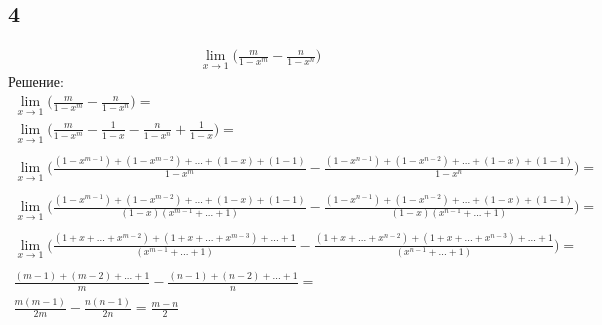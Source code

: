 		\subsection{4}
		\begin{gather*}
			\lim_{x\to 1} \biggl(\frac{m}{1 - x^m} - \frac{n}{1 - x^n}\biggl)
		\end{gather*}
		Решение:
		\begin{gather*}
			\lim_{x\to 1} \biggl(
				\frac{m}{1 - x^m} - 
				\frac{n}{1 - x^n}
			\biggl) = \\
			\lim_{x\to 1} \biggl(
				\frac{m}{1 - x^m} - \frac{1}{1-x} - 
				\frac{n}{1 - x^n} + \frac{1}{1-x}
			\biggl) = \\ 
			\\
			\lim_{x\to 1} \biggl(
				\frac{(1-x^{m-1}) + (1-x^{m-2}) + ... + (1 - x) + (1 - 1)}{1 - x^m} - 
				\frac{(1-x^{n-1}) + (1-x^{n-2}) + ... + (1 - x) + (1 - 1)}{1 - x^n}
			\biggl) = \\ 
			\\
			\lim_{x\to 1} \biggl(
				\frac{(1-x^{m-1}) + (1-x^{m-2}) + ... + (1 - x) + (1 - 1)}{(1 - x)(x^{m-1} + ... + 1)} - 
				\frac{(1-x^{n-1}) + (1-x^{n-2}) + ... + (1 - x) + (1 - 1)}{(1 - x)(x^{n-1} + ... + 1)}
			\biggl) = \\ 
			\\
			\lim_{x\to 1} \biggl(
				\frac{(1 + x + ... + x^{m-2}) + (1 + x + ... + x^{m-3}) + ... + 1}{(x^{m-1} + ... + 1)} - 
				\frac{(1 + x + ... + x^{n-2}) + (1 + x + ... + x^{n-3}) + ... + 1}{(x^{n-1} + ... + 1)}
			\biggl) = \\ 
			\\	
			\frac{(m - 1) + (m - 2) + ... + 1}{m} - 
			\frac{(n - 1) + (n - 2) + ... + 1}{n} = \\  
			\frac{m(m - 1)}{2m} - 
			\frac{n(n - 1)}{2n} = \frac{m - n}{2}	
		\end{gather*}

